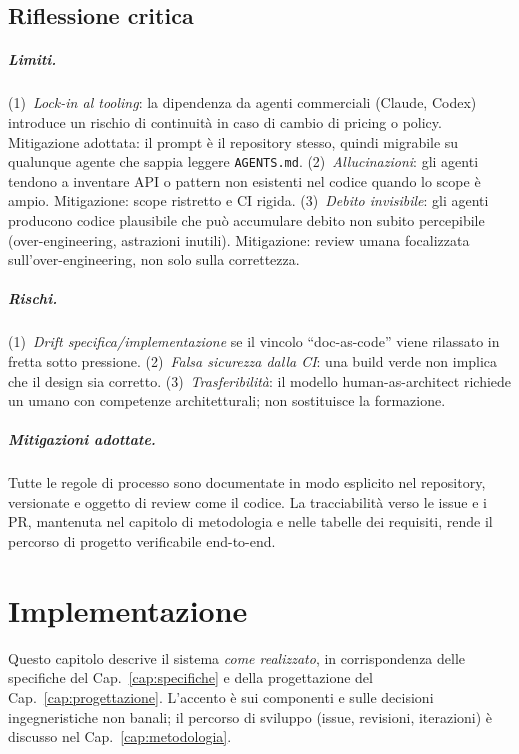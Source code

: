 \section{Riflessione critica}
\paragraph{Limiti.} (1)~\emph{Lock-in al tooling}: la dipendenza da agenti
commerciali (Claude, Codex) introduce un rischio di continuità in caso di
cambio di pricing o policy. Mitigazione adottata: il prompt è il repository
stesso, quindi migrabile su qualunque agente che sappia leggere
\texttt{AGENTS.md}. (2)~\emph{Allucinazioni}: gli agenti tendono a inventare
API o pattern non esistenti nel codice quando lo scope è ampio. Mitigazione:
scope ristretto e CI rigida. (3)~\emph{Debito invisibile}: gli agenti
producono codice plausibile che può accumulare debito non subito
percepibile (over-engineering, astrazioni inutili). Mitigazione: review umana
focalizzata sull'over-engineering, non solo sulla correttezza.

\paragraph{Rischi.} (1)~\emph{Drift specifica/implementazione} se il vincolo
``doc-as-code'' viene rilassato in fretta sotto pressione. (2)~\emph{Falsa
sicurezza dalla CI}: una build verde non implica che il design sia
corretto. (3)~\emph{Trasferibilità}: il modello human-as-architect richiede un
umano con competenze architetturali; non sostituisce la formazione.

\paragraph{Mitigazioni adottate.} Tutte le regole di processo sono
documentate in modo esplicito nel repository, versionate e oggetto di
review come il codice. La tracciabilità verso le issue e i PR, mantenuta
nel capitolo di metodologia e nelle tabelle dei requisiti, rende il
percorso di progetto verificabile end-to-end.

\chapter{Implementazione}
\label{cap:implementazione}

Questo capitolo descrive il sistema \emph{come realizzato}, in
corrispondenza delle specifiche del Cap.~\ref{cap:specifiche} e della
progettazione del Cap.~\ref{cap:progettazione}. L'accento è sui
componenti e sulle decisioni ingegneristiche non banali; il percorso di
sviluppo (issue, revisioni, iterazioni) è discusso nel
Cap.~\ref{cap:metodologia}.


